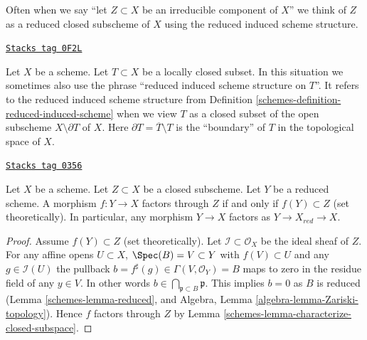 Often when we say ``let $Z \subset X$ be an irreducible component of $X$''
we think of $Z$ as a reduced closed subscheme of $X$ using the reduced induced
scheme structure.

\begin{remark}
\label{schemes-remark-reduced-induced-locally-closed}
\href{https://stacks.math.columbia.edu/tag/0F2L}{\texttt{Stacks tag 0F2L}}

Let $X$ be a scheme. Let $T \subset X$ be a locally closed subset.
In this situation we sometimes also use the phrase
``reduced induced scheme structure on $T$''. It refers
to the reduced induced scheme structure from
Definition \ref{schemes-definition-reduced-induced-scheme}
when we view $T$ as a closed subset of the open subscheme
$X \setminus \partial T$ of $X$. Here
$\partial T = \overline{T} \setminus T$ is the ``boundary'' of $T$
in the topological space of $X$.
\end{remark}

\begin{lemma}
\label{schemes-lemma-map-into-reduction}
\href{https://stacks.math.columbia.edu/tag/0356}{\texttt{Stacks tag 0356}}

Let $X$ be a scheme.
Let $Z \subset X$ be a closed subscheme.
Let $Y$ be a reduced scheme.
A morphism $f : Y \to X$ factors through $Z$ if and only if
$f(Y) \subset Z$ (set theoretically). In particular, any
morphism $Y \to X$ factors as $Y \to X_{red} \to X$.
\end{lemma}

\begin{proof}

Assume $f(Y) \subset Z$ (set theoretically).
Let $\mathcal{I} \subset \mathcal{O}_X$ be the ideal sheaf of $Z$.
For any affine opens $U \subset X$, $\Spec(B) = V \subset Y$
with $f(V) \subset U$ and any $g \in \mathcal{I}(U)$
the pullback $b = f^\sharp(g) \in \Gamma(V, \mathcal{O}_Y) = B$
maps to zero in the residue field of any $y \in V$.
In other words $b \in \bigcap_{\mathfrak p \subset B} \mathfrak p$.
This implies $b = 0$ as $B$ is reduced (Lemma \ref{schemes-lemma-reduced}, and
Algebra, Lemma \ref{algebra-lemma-Zariski-topology}).
Hence $f$ factors through
$Z$ by Lemma \ref{schemes-lemma-characterize-closed-subspace}.
\end{proof}

